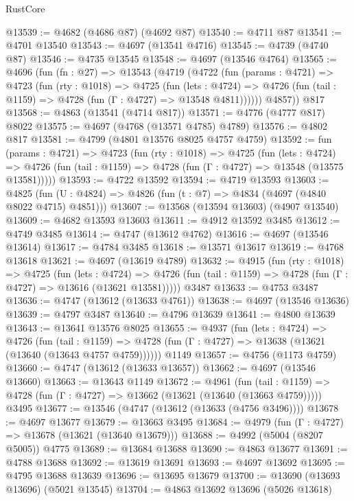 \begin{lexlean}{RustCore}
\begin{coremodule}
@13539 := @4682 (@4686 @87) (@4692 @87)
@13540 := @4711 @87
@13541 := @4701 @13540
@13543 := @4697 (@13541 @4716)
@13545 := @4739 (@4740 @87)
@13546 := @4735 @13545
@13548 := @4697 (@13546 @4764)
@13565 := @4696
    (fun (fn : @27) =>
    @13543
      (@4719
        (@4722
          (fun (params : @4721) =>
          @4723
            (fun (rty : @1018) =>
            @4725
              (fun (lets : @4724) =>
              @4726 (fun (tail : @1159) => @4728 (fun (Γ : @4727) => @13548 @4811))))))
        @4857))
    @817
@13568 := @4863 (@13541 (@4714 @817))
@13571 := @4776 (@4777 @817) @8022
@13575 := @4697 (@4768 (@13571 @4785) @4789)
@13576 := @4802 @817
@13581 := @4799 (@4801 @13576 @8025 @4757 @4759)
@13592 := fun (params : @4721) =>
  @4723
    (fun (rty : @1018) =>
    @4725
      (fun (lets : @4724) =>
      @4726 (fun (tail : @1159) => @4728 (fun (Γ : @4727) => @13548 (@13575 @13581)))))
@13593 := @4722 @13592
@13594 := @4719 @13593
@13603 := @4825 (fun (U : @4824) => @4826 (fun (t : @7) => @4834 (@4697 (@4840 @8022 @4715) @4851)))
@13607 := @13568 (@13594 @13603) (@4907 @13540)
@13609 := @4682 @13593 @13603
@13611 := @4912 @13592 @3485
@13612 := @4749 @3485
@13614 := @4747 (@13612 @4762)
@13616 := @4697 (@13546 @13614)
@13617 := @4784 @3485
@13618 := @13571 @13617
@13619 := @4768 @13618
@13621 := @4697 (@13619 @4789)
@13632 := @4915
    (fun (rty : @1018) =>
    @4725
      (fun (lets : @4724) =>
      @4726 (fun (tail : @1159) => @4728 (fun (Γ : @4727) => @13616 (@13621 @13581)))))
    @3487
@13633 := @4753 @3487
@13636 := @4747 (@13612 (@13633 @4761))
@13638 := @4697 (@13546 @13636)
@13639 := @4797 @3487
@13640 := @4796 @13639
@13641 := @4800 @13639
@13643 := @13641 @13576 @8025
@13655 := @4937
    (fun (lets : @4724) =>
    @4726
      (fun (tail : @1159) =>
      @4728 (fun (Γ : @4727) => @13638 (@13621 (@13640 (@13643 @4757 @4759))))))
    @1149
@13657 := @4756 (@1173 @4759)
@13660 := @4747 (@13612 (@13633 @13657))
@13662 := @4697 (@13546 @13660)
@13663 := @13643 @1149
@13672 := @4961
    (fun (tail : @1159) => @4728 (fun (Γ : @4727) => @13662 (@13621 (@13640 (@13663 @4759)))))
    @3495
@13677 := @13546 (@4747 (@13612 (@13633 (@4756 @3496))))
@13678 := @4697 @13677
@13679 := @13663 @3495
@13684 := @4979 (fun (Γ : @4727) => @13678 (@13621 (@13640 @13679)))
@13688 := @4992 (@5004 (@8207 @5005)) @4775
@13689 := @13684 @13688
@13690 := @4863 @13677
@13691 := @4788 @13688
@13692 := @13619 @13691
@13693 := @4697 @13692
@13695 := @4795 @13688 @13639
@13696 := @13695 @13679
@13700 := @13690 (@13693 @13696) (@5021 @13545)
@13704 := @4863 @13692 @13696 (@5026 @13618)

\end{coremodule}
\end{lexlean}
